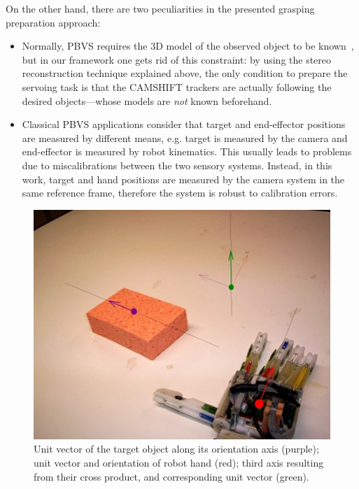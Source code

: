On the other hand, there are two peculiarities in the presented grasping preparation approach:
%
\begin{itemize}
\item Normally, \ac{PBVS} requires the 3D model of the observed object to be known~\cite{hutchinson:1996}, but in our framework one gets rid of this constraint: by using the stereo reconstruction technique explained above, the only condition to prepare the servoing task is that the \ac{CAMSHIFT} trackers are actually following the desired objects---whose models are \emph{not} known beforehand.

\item Classical \ac{PBVS} applications consider that target and end-effector positions are measured by different means, e.g. target is measured by the camera and end-effector is measured by robot kinematics. This usually leads to problems due to miscalibrations between the two sensory systems. Instead, in this work, target and hand positions are measured by the camera system in the same reference frame, therefore the system is robust to calibration errors.
\end{itemize}

\begin{figure}
\centering
\includegraphics{figures/cross_prod2}
\caption[Cross product between hand and target orientations]{Unit vector of the target object along its orientation axis (purple); unit vector and orientation of robot hand (red); third axis resulting from their cross product, and corresponding unit vector (green).}
\label{img:cross_prod2}
\end{figure}

